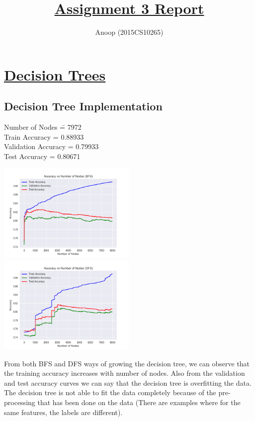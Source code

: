 \documentclass[12pt]{article}
\title{\textbf{\underline{Assignment 3 Report}}}
\author{Anoop (2015CS10265)}
\begin{document}
\maketitle

\section*{\underline{Decision Trees}}
\subsection*{Decision Tree Implementation}
\begin{addmargin}[0.3in]{0in}
\begin{tabbing}
Number of Nodes \qquad \= = 7972 \\
Train Accuracy \> = 0.88933 \\
Validation Accuracy \> = 0.79933 \\
Test Accuracy  \> = 0.80671 \\
\end{tabbing}
\end{addmargin}
\includegraphics[width=0.5\textwidth]{dtree1.png}
\includegraphics[width=0.5\textwidth]{dtree2.png}
\vspace{1mm}
\begin{addmargin}[0.3in]{0in}
From both BFS and DFS ways of growing the decision tree, we can observe that the training accuracy increases with number of nodes. Also from the validation and test accuracy curves we can say that the decision tree is overfitting the data. The decision tree is not able to fit the data completely because of the pre-processing that has been done on the data (There are examples where for the same features, the labels are different).
\end{addmargin}
\end{document}
